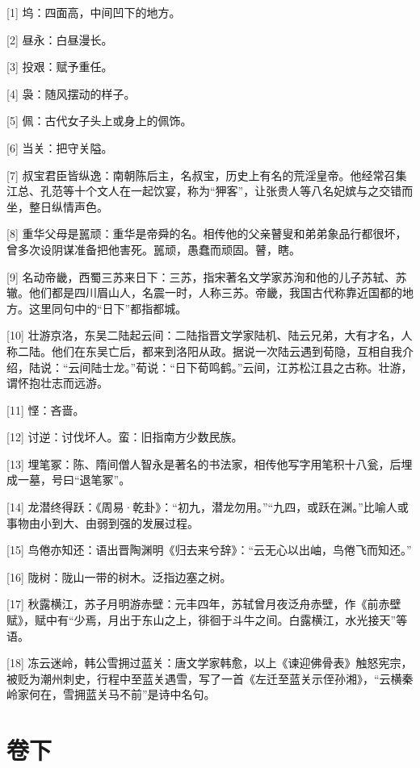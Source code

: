 \documentclass[12pt,UTF8]{ctexbook}
\begin{document}
[1] 坞：四面高，中间凹下的地方。

[2] 昼永：白昼漫长。

[3] 投艰：赋予重任。

[4] 袅：随风摆动的样子。

[5] 佩：古代女子头上或身上的佩饰。

[6] 当关：把守关隘。

[7] 叔宝君臣皆纵逸：南朝陈后主，名叔宝，历史上有名的荒淫皇帝。他经常召集江总、孔范等十个文人在一起饮宴，称为“狎客”，让张贵人等八名妃嫔与之交错而坐，整日纵情声色。

[8] 重华父母是嚚顽：重华是帝舜的名。相传他的父亲瞽叟和弟弟象品行都很坏，曾多次设阴谋准备把他害死。嚚顽，愚蠢而顽固。瞽，瞎。

[9] 名动帝畿，西蜀三苏来日下：三苏，指宋著名文学家苏洵和他的儿子苏轼、苏辙。他们都是四川眉山人，名震一时，人称三苏。帝畿，我国古代称靠近国都的地方。这里同句中的“日下”都指都城。

[10] 壮游京洛，东吴二陆起云间：二陆指晋文学家陆机、陆云兄弟，大有才名，人称二陆。他们在东吴亡后，都来到洛阳从政。据说一次陆云遇到荀隐，互相自我介绍，陆说：“云间陆士龙。”荀说：“日下荀鸣鹤。”云间，江苏松江县之古称。壮游，谓怀抱壮志而远游。

[11] 悭：吝啬。

[12] 讨逆：讨伐坏人。蛮：旧指南方少数民族。

[13] 埋笔冢：陈、隋间僧人智永是著名的书法家，相传他写字用笔积十八瓮，后埋成一墓，号曰“退笔冢”。

[14] 龙潜终得跃：《周易·乾卦》：“初九，潜龙勿用。”“九四，或跃在渊。”比喻人或事物由小到大、由弱到强的发展过程。

[15] 鸟倦亦知还：语出晋陶渊明《归去来兮辞》：“云无心以出岫，鸟倦飞而知还。”

[16] 陇树：陇山一带的树木。泛指边塞之树。

[17] 秋露横江，苏子月明游赤壁：元丰四年，苏轼曾月夜泛舟赤壁，作《前赤壁赋》，赋中有“少焉，月出于东山之上，徘徊于斗牛之间。白露横江，水光接天”等语。

[18] 冻云迷岭，韩公雪拥过蓝关：唐文学家韩愈，以上《谏迎佛骨表》触怒宪宗，被贬为潮州刺史，行程中至蓝关遇雪，写了一首《左迁至蓝关示侄孙湘》，“云横秦岭家何在，雪拥蓝关马不前”是诗中名句。





\part{卷下}
\end{document}
